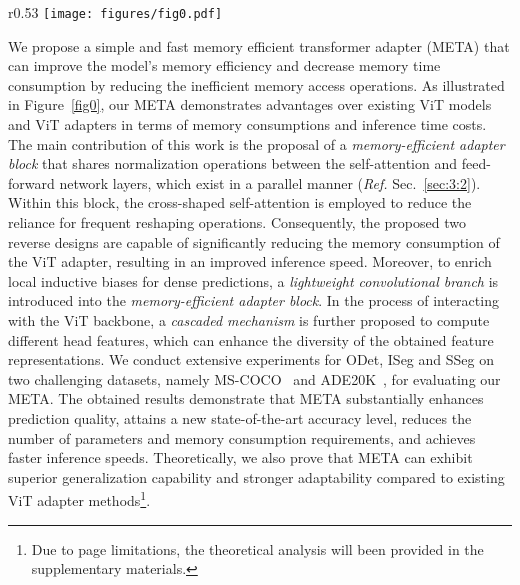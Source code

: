 % 
\begin{wrapfigure}{r}{0.53\textwidth}
\centering
\vspace{-4mm}
\texttt{[image: figures/fig0.pdf]}
\vspace{-8mm}
\caption{\footnotesize Qualitative performance comparisons of different models with respect to training parameters, application gaps, memory access costs, and inference time costs.}
\vspace{-4mm}
\label{fig0}
\end{wrapfigure}
We propose a simple and fast memory efficient transformer adapter (META) that can improve the model's memory efficiency and decrease memory time consumption by reducing the inefficient memory access operations. 
%
As illustrated in Figure~\ref{fig0}, our META demonstrates advantages over existing ViT models and ViT adapters in terms of memory consumptions and inference time costs.
%
The main contribution of this work is the proposal of a \emph{{memory-efficient adapter block}} that shares {normalization operations} between the self-attention and feed-forward network layers, which exist in a parallel manner (\emph{Ref.} Sec.~\ref{sec:3:2}). Within this block, the cross-shaped self-attention is employed to reduce the reliance for frequent {reshaping operations}. 
%
Consequently, the proposed two reverse designs are capable of significantly reducing the memory consumption of the ViT adapter, resulting in an improved inference speed.
%
Moreover, to enrich local inductive biases for dense predictions, a \emph{{lightweight convolutional branch}} is introduced into the \emph{{memory-efficient adapter block}}. 
%
In the process of interacting with the ViT backbone, a \emph{{cascaded mechanism}} is further proposed to compute different head features, which can enhance the diversity of the obtained feature representations. We conduct extensive experiments for ODet, ISeg and SSeg on two challenging datasets, namely MS-COCO~\citep{lin2014microsoft} and ADE20K~\citep{zhou2017scene}, for evaluating our META. 
%
The obtained results demonstrate that META substantially enhances prediction quality, attains a new state-of-the-art accuracy level, reduces the number of parameters and memory consumption requirements, and achieves faster inference speeds. Theoretically, we also prove that META can exhibit superior generalization capability and stronger adaptability compared to existing ViT adapter methods\footnote{Due to page limitations, the theoretical analysis will been provided in the supplementary materials.}.